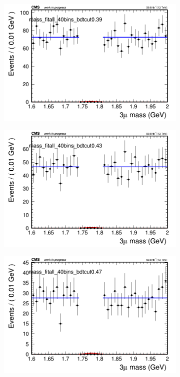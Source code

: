 \begin{figure}[H]
\begin{subfigure}{0.2\textwidth}
        \caption{}
    \end{subfigure}
    \begin{subfigure}{0.2\textwidth}
        \includegraphics[width=\textwidth]{flat_fit/plots/all/massfit_all_40bins_bdtcut0.39.png}
        \caption{}
    \end{subfigure}
    \begin{subfigure}{0.2\textwidth}
        \includegraphics[width=\textwidth]{flat_fit/plots/all/massfit_all_40bins_bdtcut0.43.png}
        \caption{}
    \end{subfigure}
    \begin{subfigure}{0.2\textwidth}
        \includegraphics[width=\textwidth]{flat_fit/plots/all/massfit_all_40bins_bdtcut0.47.png}

\end{subfigure}
\end{figure}
